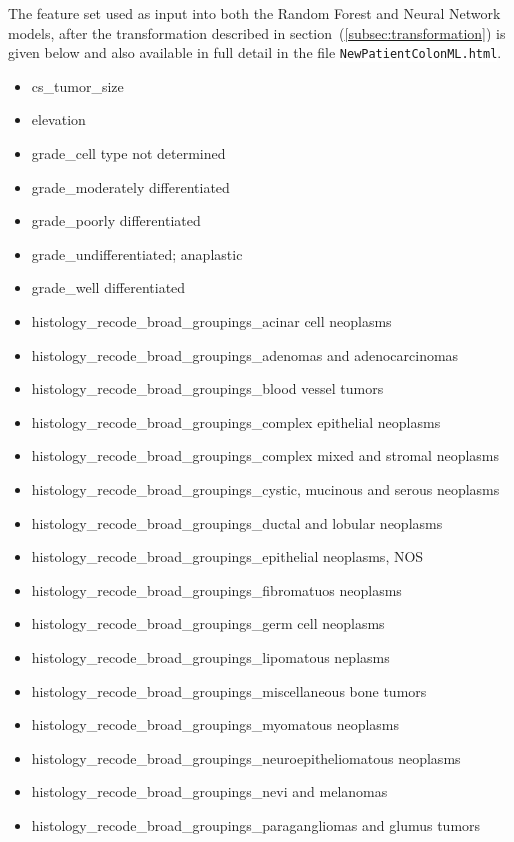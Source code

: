 \documentclass[a4paper,11pt]{article}
\newcommand{\codewhite}[1]{\colorbox{white}{\texttt{#1}}}
\begin{document}
The feature set used as input into both the Random Forest and Neural Network models, after the transformation described in section~(\ref{subsec:transformation}) is given below and also available in full detail in the file 
\codewhite{NewPatientColonML.html}.


\begin{itemize}[noitemsep]
\item cs\_tumor\_size
\item elevation
\item grade\_cell type not determined
\item grade\_moderately differentiated
\item grade\_poorly differentiated
\item grade\_undifferentiated; anaplastic
\item grade\_well differentiated
\item histology\_recode\_broad\_groupings\_acinar cell neoplasms
\item histology\_recode\_broad\_groupings\_adenomas and adenocarcinomas
\item histology\_recode\_broad\_groupings\_blood vessel tumors
\item histology\_recode\_broad\_groupings\_complex epithelial neoplasms
\item histology\_recode\_broad\_groupings\_complex mixed and stromal neoplasms
\item histology\_recode\_broad\_groupings\_cystic, mucinous and serous neoplasms
\item histology\_recode\_broad\_groupings\_ductal and lobular neoplasms
\item histology\_recode\_broad\_groupings\_epithelial neoplasms, NOS
\item histology\_recode\_broad\_groupings\_fibromatuos neoplasms
\item histology\_recode\_broad\_groupings\_germ cell neoplasms
\item histology\_recode\_broad\_groupings\_lipomatous neplasms
\item histology\_recode\_broad\_groupings\_miscellaneous bone tumors
\item histology\_recode\_broad\_groupings\_myomatous neoplasms
\item histology\_recode\_broad\_groupings\_neuroepitheliomatous neoplasms
\item histology\_recode\_broad\_groupings\_nevi and melanomas
\item histology\_recode\_broad\_groupings\_paragangliomas and glumus tumors

\end{itemize}
\end{document}
